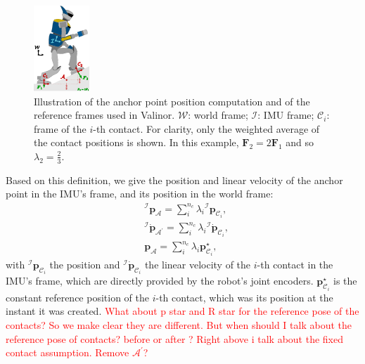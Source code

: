\documentclass{IJCAS}
\begin{document}
\begin{figure}[!t]
\begin{center}
\includegraphics[width=0.5\columnwidth]{Uploaded/Images/framesAndAnchor.pdf} 
\vskip -0.5pc
\caption{Illustration of the anchor point position computation and of the reference frames used in Valinor. $\mathcal{W}$: world frame; $\mathcal{I}$: IMU frame; $\mathcal{C}_{i}$: frame of the $i$-th contact. For clarity, only the weighted average of the contact positions is shown. In this example, $\boldsymbol{F}_{2} = 2\boldsymbol{F}_{1}$ and so $\lambda_{2} = \frac{2}{3}$.}\label{fig:framesAndAnchor}
\end{center}
\vskip -1.5pc
\end{figure}

Based on this definition, we give the position and linear velocity of the anchor point in the IMU's frame, and its position in the world frame:
\begin{align} 
&{^{\mathcal{I}}}\boldsymbol{p}_{\mathcal{A}} = \sum^{n_{c}}_{i} \lambda_{i}  {^{\mathcal{I}}} \boldsymbol{p}_{{\mathcal{C}}_{i}}, \label{eq:imuAnchorPos} \\
&{^{\mathcal{I}}} \dot{\boldsymbol{p}}_{\mathcal{A}^{\prime}} = \sum^{n_{c}}_{i} \lambda_{i}  {^{\mathcal{I}}} \dot{\boldsymbol{p}}_{{\mathcal{C}}_{i}}, \label{eq:imuAnchorVel} \\
&\boldsymbol{p}_{\mathcal{A}} = \sum^{n_{c}}_{i} \lambda_{i} \boldsymbol{p}^{\star}_{{\mathcal{C}}_{i}}, \label{eq:anchorPointPos}
\end{align} 
with ${^{\mathcal{I}}} \boldsymbol{p}_{{\mathcal{C}}_{i}}$ the position and ${^{\mathcal{I}}} \dot{\boldsymbol{p}}_{{\mathcal{C}}_{i}}$ the linear velocity of the $i$-th contact in the IMU's frame, which are directly provided by the robot's joint encoders. $\boldsymbol{p}^{\star}_{{\mathcal{C}}_{i}}$ is the constant reference position of the $i$-th contact, which was its position at the instant it was created.
\textcolor{red}{What about p star and R star for the reference pose of the contacts? So we make clear they are different. But when should I talk about the reference pose of contacts? before or after ? Right above i talk about the fixed contact assumption.}
\textcolor{red}{Remove $\mathcal{A}^\prime$?}
\end{document}
